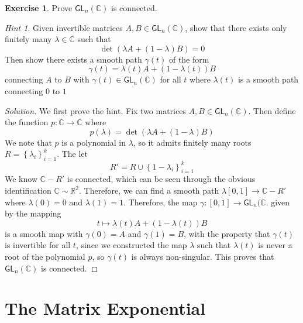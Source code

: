 \documentclass[psamsfonts]{amsart}
\theoremstyle{definition}
\newtheorem{exer}[thm]{Exercise}
\theoremstyle{remark}
\newtheorem*{hint*}{Hint}
\newcommand{\R}{\mathbb{R}}
\newcommand{\C}{\mathbb{C}}
\newcommand{\GL}{\mathsf{GL}}
\newcommand{\set}[1]{\left\lbrace#1 \right\rbrace}
\begin{document}
\begin{exer}
Prove $\GL_n(\C)$ is connected. 
\begin{hint*}
Given invertible matrices $A,B \in \GL_n(\C)$, show that there exists only finitely many $\lambda \in \C$ such that 
$$\det(\lambda A + (1 - \lambda)B) = 0 $$
Then show there exists a smooth path $\gamma(t)$ of the form
$$\gamma(t) = \lambda(t)A + (1-\lambda(t))B $$
connecting $A$ to $B$ with $\gamma(t) \in \GL_n(\C)$ for all $t$ where $\lambda(t)$ is a smooth path connecting $0$ to $1$
\end{hint*}
\end{exer}

\begin{proof}[Solution]
We first prove the hint. Fix two matrices $A,B \in \GL_n(\C)$. Then define the function $p: \C \to \C$ where
$$p(\lambda) = \det (\lambda A + (1 - \lambda)B) $$
We note that $p$ is a polynomial in $\lambda$, so it admits finitely many roots $R =\set{\lambda_i}_{i = 1}^k$. The let 
$$R' = R \cup \set{1-\lambda_i}_{i =1}^k $$
We know $\C - R'$ is connected, which can be seen through the obvious identification $\C \sim \R^2$. Therefore, we can find a smooth path $\lambda [0,1] \to \C - R'$ where $\lambda(0) = 0$ and $\lambda(1) = 1$. Therefore, the map $\gamma:[0,1] \to \GL_n(\C$. given by the mapping
$$t \mapsto \lambda(t) A + (1-\lambda(t)) B $$
is a smooth map with $\gamma(0) = A$ and $\gamma(1) = B$, with the property that $\gamma(t)$ is invertible for all $t$, since we constructed the map $\lambda$ such that $\lambda(t)$ is never a root of the polynomial $p$, so $\gamma(t)$ is always non-singular. This proves that $\GL_n(\C)$ is connected.
\end{proof}

\section{The Matrix Exponential}
\end{document}
